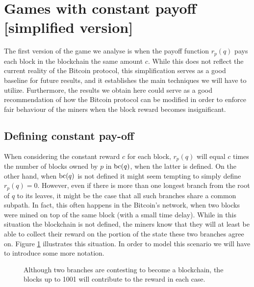 

\section{Games with constant payoff [simplified version]}
\label{sec-const_rew}

The first version of the game we analyse is when the payoff function $r_p(q)$ pays each block in the blockchain the same amount $c$. While this does not reflect the current reality of the Bitcoin protocol, this simplification serves as a good baseline for future results, and it establishes the main techniques we will have to utilize. Furthermore, the results we obtain here could serve as a good recommendation of how the Bitcoin protocol can be modified in order to enforce fair behaviour of the miners when the block reward becomes insignificant.

\subsection{Defining constant pay-off}
When considering the constant reward $c$ for each block, $r_p(q)$ will equal $c$ times the number of blocks owned by $p$ in $\text{bc}(q)$, when the latter is defined. On the other hand, when $\text{bc}(q)$ is not defined it might seem tempting to simply define $r_p(q) = 0$. However, even if there is more than one longest branch from the root of $q$ to its leaves, it might be the case that all such branches share a common subpath. In fact, this often happens in the Bitcoin's network, when two blocks were mined on top of the same block (with a small time delay). While in this situation the blockchain is not defined, the miners know that they will at least be able to collect their reward on the portion of the state these two branches agree on. Figure \ref{fig-simple-fork} illustrates this situation. In order to model this scenario we will have to introduce some more notation. 

\begin{figure}
\begin{center}
\end{center}
\label{fig-simple-fork}
\caption{Although two branches are contesting to become a blockchain, the blocks up to 1001 will contribute to the reward in each case.}
\end{figure}


